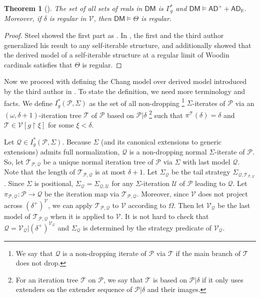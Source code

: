 \documentclass{amsart}
\newtheorem{thm}[dfn]{Theorem}
\newcommand{\uphar}{\mathbin{\upharpoonright}}
\begin{document}
\begin{thm}[\cite{CPMP,dm_of_self_it}]\label{determinacy_in_DM}
The set of all sets of reals in $\mathsf{DM}$ is $\Gamma^*_g$ and $\mathsf{DM}\models\mathsf{AD}^{+}+\mathsf{AD}_{\mathbb{R}}$.
Moreover, if $\delta$ is regular in $\mathcal{V}$, then $\mathsf{DM}\models\Theta$ is regular.
\end{thm}
\begin{proof}
Steel showed the first part as \cite[Theorem 11.3.2]{CPMP}.
In \cite{dm_of_self_it}, the first and the third author generalized his result to any self-iterable structure, and additionally showed that the derived model of a self-iterable structure at a regular limit of Woodin cardinals satisfies that $\Theta$ is regular.
\end{proof}

Now we proceed with defining the Chang model over derived model introduced by the third author in \cite{CoveringChang}.
To state the definition, we need more terminology and facts.
We define $I^*_g(\mathcal{P}, \Sigma)$ as the set of all non-dropping \footnote{We say that $\mathcal{Q}$ is a non-dropping iterate of $\mathcal{P}$ via $\mathcal{T}$ if the main branch of $\mathcal{T}$ does not drop.} $\Sigma$-iterates of $\mathcal{P}$ via an $(\omega, \delta+1)$-iteration tree $\mathcal{T}$ of $\mathcal{P}$ based on $\mathcal{P}\vert\delta$ \footnote{For an iteration tree $\mathcal{T}$ on $\mathcal{P}$, we say that $\mathcal{T}$ is based on $\mathcal{P}\vert\delta$ if it only uses extenders on the extender sequence of $\mathcal{P}\vert\delta$ and their images.} such that $\pi^{\mathcal{T}}(\delta)=\delta$ and $\mathcal{T}\in\mathcal{V}[g\uphar\xi]$ for some $\xi<\delta$.

Let $\mathcal{Q}\in I^*_g(\mathcal{P}, \Sigma)$.
Because $\Sigma$ (and its canonical extensions to generic extensions) admits full normalization, $\mathcal{Q}$ is a non-dropping normal $\Sigma$-iterate of $\mathcal{P}$.
So, let $\mathcal{T}_{\mathcal{P}, \mathcal{Q}}$ be a unique normal iteration tree of $\mathcal{P}$ via $\Sigma$ with last model $\mathcal{Q}$.
Note that the length of $\mathcal{T}_{\mathcal{P}, \mathcal{Q}}$ is at most $\delta+1$.
Let $\Sigma_{\mathcal{Q}}$ be the tail strategy $\Sigma_{\mathcal{Q}, \mathcal{T}_{\mathcal{P}, \mathcal{Q}}}$.
Since $\Sigma$ is positional, $\Sigma_{\mathcal{Q}}=\Sigma_{\mathcal{Q}, \mathcal{U}}$ for any $\Sigma$-iteration $\mathcal{U}$ of $\mathcal{P}$ leading to $\mathcal{Q}$.
Let $\pi_{\mathcal{P}, \mathcal{Q}}\colon\mathcal{P}\to\mathcal{Q}$ be the iteration map via $\mathcal{T}_{\mathcal{P}, \mathcal{Q}}$.
Moreover, since $\mathcal{V}$ does not project across $(\delta^+)^{\mathcal{V}}$, we can apply $\mathcal{T}_{\mathcal{P}, \mathcal{Q}}$ to $\mathcal{V}$ according to $\Omega$.
Then let $\mathcal{V}_{\mathcal{Q}}$ be the last model of $\mathcal{T}_{\mathcal{P}, \mathcal{Q}}$ when it is applied to $\mathcal{V}$.
It is not hard to check that $\mathcal{Q}=\mathcal{V}_{\mathcal{Q}}\vert(\delta^+)^{\mathcal{V}_{\mathcal{Q}}}$ and $\Sigma_{\mathcal{Q}}$ is determined by the strategy predicate of $\mathcal{V}_{\mathcal{Q}}$.
\end{document}
